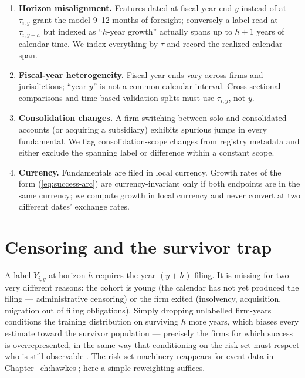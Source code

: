 \begin{enumerate}
\item \textbf{Horizon misalignment.} Features dated at fiscal year end $y$ instead of at
$\tau_{i,y}$ grant the model 9--12 months of foresight; conversely a label read at
$\tau_{i,y+h}$ but indexed as ``$h$-year growth'' actually spans up to $h{+}1$ years of
calendar time. We index everything by $\tau$ and record the realized calendar span.
\item \textbf{Fiscal-year heterogeneity.} Fiscal year ends vary across firms and
jurisdictions; ``year $y$'' is not a common calendar interval. Cross-sectional
comparisons and time-based validation splits must use $\tau_{i,y}$, not $y$.
\item \textbf{Consolidation changes.} A firm switching between solo and consolidated
accounts (or acquiring a subsidiary) exhibits spurious jumps in every fundamental. We
flag consolidation-scope changes from registry metadata and either exclude the spanning
label or difference within a constant scope.
\item \textbf{Currency.} Fundamentals are filed in local currency. Growth rates of the
form (\ref{eq:success-arc}) are currency-invariant only if both endpoints are in the
same currency; we compute growth in local currency and never convert at two different
dates' exchange rates.
\end{enumerate}

\section{Censoring and the survivor trap}
\label{sec:success-censoring}

A label $Y_{i,y}$ at horizon $h$ requires the year-$(y{+}h)$ filing. It is missing for
two very different reasons: the cohort is young (the calendar has not yet produced the
filing --- administrative censoring) or the firm exited (insolvency, acquisition,
migration out of filing obligations). Simply dropping unlabelled firm-years conditions
the training distribution on surviving $h$ more years, which biases every estimate
toward the survivor population --- precisely the firms for which success is
overrepresented, in the same way that conditioning on the risk set must respect who is
still observable \cite{cox1972}. The risk-set machinery reappears for event data in
Chapter~\ref{ch:hawkes}; here a simple reweighting suffices.


